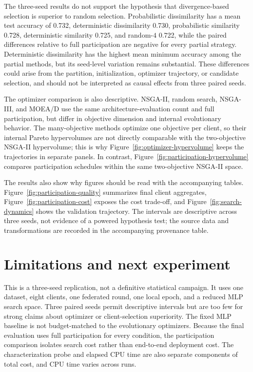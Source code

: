\documentclass[11pt]{article}
\begin{document}
The three-seed results do not support the hypothesis that divergence-based selection is superior to random selection. Probabilistic dissimilarity has a mean test accuracy of 0.732, deterministic dissimilarity 0.730, probabilistic similarity 0.728, deterministic similarity 0.725, and random-$4$ 0.722, while the paired differences relative to full participation are negative for every partial strategy. Deterministic dissimilarity has the highest mean minimum accuracy among the partial methods, but its seed-level variation remains substantial. These differences could arise from the partition, initialization, optimizer trajectory, or candidate selection, and should not be interpreted as causal effects from three paired seeds.

The optimizer comparison is also descriptive. NSGA-II, random search, NSGA-III, and MOEA/D use the same architecture-evaluation count and full participation, but differ in objective dimension and internal evolutionary behavior. The many-objective methods optimize one objective per client, so their internal Pareto hypervolumes are not directly comparable with the two-objective NSGA-II hypervolume; this is why Figure~\ref{fig:optimizer-hypervolume} keeps the trajectories in separate panels. In contrast, Figure~\ref{fig:participation-hypervolume} compares participation schedules within the same two-objective NSGA-II space.

The results also show why figures should be read with the accompanying tables. Figure~\ref{fig:participation-quality} summarizes final client aggregates, Figure~\ref{fig:participation-cost} exposes the cost trade-off, and Figure~\ref{fig:search-dynamics} shows the validation trajectory. The intervals are descriptive across three seeds, not evidence of a powered hypothesis test; the source data and transformations are recorded in the accompanying provenance table.

\section{Limitations and next experiment}

This is a three-seed replication, not a definitive statistical campaign. It uses one dataset, eight clients, one federated round, one local epoch, and a reduced MLP search space. Three paired seeds permit descriptive intervals but are too few for strong claims about optimizer or client-selection superiority. The fixed MLP baseline is not budget-matched to the evolutionary optimizers. Because the final evaluation uses full participation for every condition, the participation comparison isolates search cost rather than end-to-end deployment cost. The characterization probe and elapsed CPU time are also separate components of total cost, and CPU time varies across runs.
\end{document}
